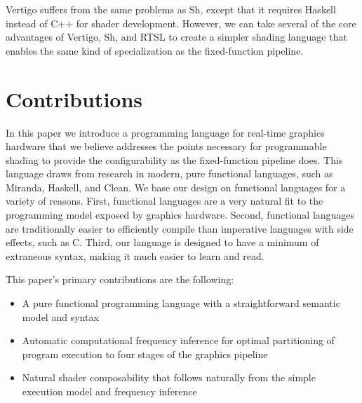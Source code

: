 \documentclass{acmsiggraph}               %
\begin{document}
Vertigo suffers from the same problems as Sh, except that it requires
Haskell instead of C++ for shader development.  However, we can take
several of the core advantages of Vertigo, Sh, and RTSL to create a
simpler shading language that enables the same kind of specialization
as the fixed-function pipeline.


\section{Contributions}


In this paper we introduce a programming language for real-time
graphics hardware that we believe addresses the points necessary for
programmable shading to provide the configurability as the
fixed-function pipeline does.  This language draws from research in
modern, pure functional languages, such as Miranda, Haskell, and
Clean.  We base our design on functional languages for a variety of
reasons.  First, functional languages are a very natural fit to the
programming model exposed by graphics hardware.  Second, functional
languages are traditionally easier to efficiently compile than
imperative languages with side effects, such as C.  Third, our
language is designed to have a minimum of extraneous syntax, making it
much easier to learn and read.

This paper's primary contributions are the following:

\begin{itemize}

\item{A pure functional programming language with a straightforward
  semantic model and syntax}

\item{Automatic computational frequency inference for optimal partitioning
  of program execution to four stages of the graphics pipeline}

\item{Natural shader composability that follows naturally from the simple
  execution model and frequency inference}

\end{itemize}
\end{document}
